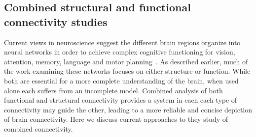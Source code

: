 
\subsection{Combined structural and functional connectivity studies}
Current views in neuroscience suggest the different brain regions organize into neural networks in order to achieve complex cognitive functioning for vision, attention, memory, language and motor planning~\cite{Rykhlevskaia2008}. As described earlier, much of the work examining these networks focuses on either structure or function. While both are essential for a more complete understanding of the brain, when used alone each suffers from an incomplete model. Combined analysis of both functional and structural connectivity provides a system in each each type of connectivity may guide the other, leading to a more reliable and concise depiction of brain connectivity. Here we discuss current approaches to they study of combined connectivity.

